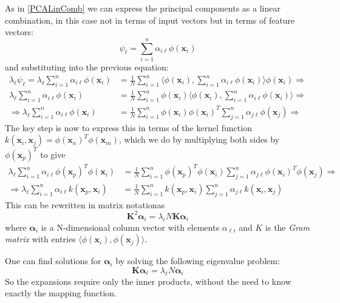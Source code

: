 \documentclass[12pt, letterpaper]{article}
\theoremstyle{definition}
\newcommand{\x}{\mathbf{x}}
\let\ti\textit
\begin{document}
As in \ref{PCALinComb} we can express the principal components as a linear combination, in this case not in terms of input vectors but in terms of feature vectors:
\begin{equation}
\psi_\ell  = \sum_{i=1}^n \alpha_{i\ell} \phi(\x_i)
\end{equation}
and substituting into the previous equation:
\begin{equation}
\begin{aligned}
\lambda_\ell \psi_\ell  = \lambda_\ell \sum_{i=1}^n \alpha_{i\ell} \phi(\x_i) &= 
\frac{1}{N}\sum_{i=1}^n \langle \phi(\x_i), \sum_{i=1}^n \alpha_{i\ell} \phi(\x_i)
\rangle \phi(\x_i)\Rightarrow\\
\lambda_\ell \sum_{i=1}^n \alpha_{i\ell} \phi(\x_i) &= \frac{1}{N}\sum_{i=1}^n \phi(\x_i)\langle \phi(\x_i), \sum_{i=1}^n \alpha_{i\ell} \phi(\x_i)
\rangle \Rightarrow\\
\Rightarrow \lambda_\ell \sum_{i=1}^n \alpha_{i\ell} \phi(\x_i) &= 
\frac{1}{N}\sum_{i=1}^n \phi(\x_i) \phi(\x_i)^T \sum_{j=1}^n \alpha_{j\ell} \phi(\x_j)  \Rightarrow
\end{aligned}
\end{equation}
The key step is now to express this in terms of the kernel function $k(\x_i , \x_j ) =
\phi(\x_n)^T\phi(\x_m )$, which we do by multiplying both sides by $\phi(\x_p)^T$ to give
\begin{equation}
\begin{aligned}
 \lambda_\ell \sum_{i=1}^n \alpha_{i\ell} \phi(\x_p)^T\phi(\x_i) &= 
\frac{1}{N}\sum_{i=1}^n \phi(\x_p)^T\phi(\x_i)  \sum_{j=1}^n \alpha_{j\ell} \phi(\x_i)^T\phi(\x_j)\Rightarrow\\
\Rightarrow  \lambda_\ell \sum_{i=1}^n \alpha_{i\ell} k(\x_p,\x_i) &= 
\frac{1}{N}\sum_{i=1}^n k(\x_p,\x_i)  \sum_{j=1}^n \alpha_{j\ell} k(\x_i,\x_j)
\end{aligned}
\end{equation}
This can be rewritten in matrix notationas
\begin{equation}
\mathbf{K}^2\mathbf{\alpha}_i = \lambda_i N  \mathbf{K} \mathbf{\alpha}_i
\end{equation}
where $\mathbf{\alpha}_i$ is a N-dimensional column vector with elements $\alpha_{\ell i}$ and $K$ is the \ti{Gram matrix} with entries $\langle \phi(\x_i), \phi(\x_j)\rangle$.

One can find solutions for $\mathbf{\alpha}_i$ by solving the following eigenvalue problem:
\begin{equation}
\mathbf{K\alpha}_\ell = \lambda_\ell N\mathbf{\alpha}_i
\end{equation}
So the expansions require only the inner products, without the need to know exactly the mapping function.
\end{document}
